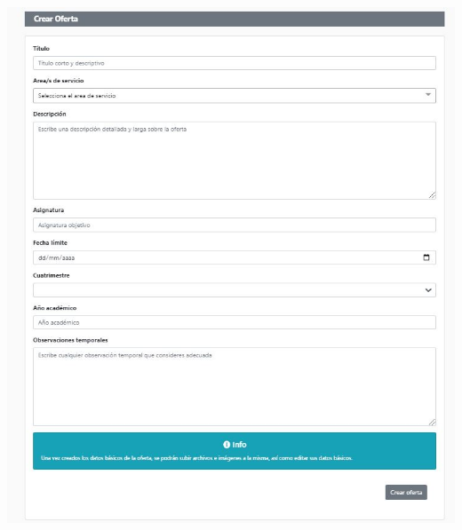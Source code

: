 \documentclass[11pt]{article}
\begin{document}
\includegraphics[width=\textwidth]{oferta}
\\\\
\end{document}
